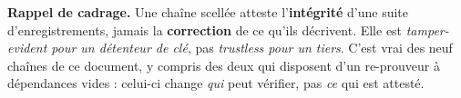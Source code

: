 \documentclass[10pt]{article}
\begin{document}
\vspace{4pt}
\begin{these}
\small\textbf{Rappel de cadrage.} Une chaîne scellée atteste l'\textbf{intégrité} d'une suite
d'enregistrements, jamais la \textbf{correction} de ce qu'ils décrivent. Elle est \emph{tamper-evident
pour un détenteur de clé}, pas \emph{trustless pour un tiers}. C'est vrai des neuf chaînes de ce
document, y compris des deux qui disposent d'un re-prouveur à dépendances vides : celui-ci change
\emph{qui} peut vérifier, pas \emph{ce} qui est attesté.
\end{these}
\end{document}
